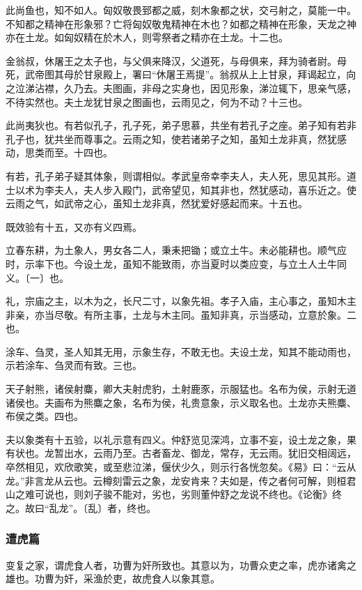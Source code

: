 \documentclass[]{article}
\begin{document}
此尚鱼也，知不如人。匈奴敬畏郅都之威，刻木象都之状，交弓射之，莫能一中。不知都之精神在形象邪？亡将匈奴敬鬼精神在木也？如都之精神在形象，天龙之神亦在土龙。如匈奴精在於木人，则雩祭者之精亦在土龙。十二也。

金翁叔，休屠王之太子也，与父俱来降汉，父道死，与母俱来，拜为骑者尉。母死，武帝图其母於甘泉殿上，署曰``休屠王焉提''。翁叔从上上甘泉，拜谒起立，向之泣涕沾襟，久乃去。夫图画，非母之实身也，因见形象，涕泣辄下，思亲气感，不待实然也。夫土龙犹甘泉之图画也，云雨见之，何为不动？十三也。

此尚夷狄也。有若似孔子，孔子死，弟子思慕，共坐有若孔子之座。弟子知有若非孔子也，犹共坐而尊事之。云雨之知，使若诸弟子之知，虽知土龙非真，然犹感动，思类而至。十四也。

有若，孔子弟子疑其体象，则谓相似。孝武皇帝幸李夫人，夫人死，思见其形。道士以术为李夫人，夫人步入殿门，武帝望见，知其非也，然犹感动，喜乐近之。使云雨之气，如武帝之心，虽知土龙非真，然犹爱好感起而来。十五也。

既效验有十五，又亦有义四焉。

立春东耕，为土象人，男女各二人，秉耒把锄；或立土牛。未必能耕也。顺气应时，示率下也。今设土龙，虽知不能致雨，亦当夏时以类应变，与立土人土牛同义。〔一〕也。

礼，宗庙之主，以木为之，长尺二寸，以象先祖。孝子入庙，主心事之，虽知木主非亲，亦当尽敬。有所主事，土龙与木主同。虽知非真，示当感动，立意於象。二也。

涂车、刍灵，圣人知其无用，示象生存，不敢无也。夫设土龙，知其不能动雨也，示若涂车、刍灵而有致。三也。

天子射熊，诸侯射麋，卿大夫射虎豹，土射鹿豕，示服猛也。名布为侯，示射无道诸侯也。夫画布为熊麋之象，名布为侯，礼贵意象，示义取名也。土龙亦夫熊麋、布侯之类。四也。

夫以象类有十五验，以礼示意有四义。仲舒览见深鸿，立事不妄，设土龙之象，果有状也。龙暂出水，云雨乃至。古者畜龙、御龙，常存，无云雨。犹旧交相阔远，卒然相见，欢欣歌笑，或至悲泣涕，偃伏少久，则示行各恍忽矣。《易》曰：``云从龙。''非言龙从云也。云樽刻雷云之象，龙安肯来？夫如是，传之者何可解，则桓君山之难可说也，则刘子骏不能对，劣也，劣则董仲舒之龙说不终也。《论衡》终之。故曰``乱龙''。〔乱〕者，终也。

\hypertarget{header-n693}{%
\subsubsection{遭虎篇}\label{header-n693}}

变复之家，谓虎食人者，功曹为奸所致也。其意以为，功曹众吏之率，虎亦诸禽之雄也。功曹为奸，采渔於吏，故虎食人以象其意。
\end{document}
